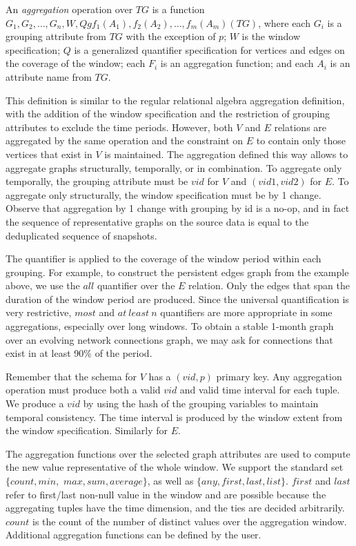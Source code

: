 \begin{definition}[\tg Aggregation]
An {\em aggregation} operation over $TG$ is a function \\ $G_1, G_2,
\ldots, G_n, W, Q g f_1(A_1), f_2(A_2), \ldots, f_m(A_m)(TG)$, where
each $G_i$ is a grouping attribute from $TG$ with the exception of
$p$; $W$ is the window specification; $Q$ is a generalized quantifier
specification for vertices and edges on the coverage of the window;
each $F_i$ is an aggregation function; and each $A_i$ is an attribute
name from $TG$.
\label{def:agg}
\end{definition}

This definition is similar to the regular relational algebra
aggregation definition, with the addition of the window specification
and the restriction of grouping attributes to exclude the time
periods.  However, both $V$ and $E$ relations are aggregated by the
same operation and the constraint on $E$ to contain only those
vertices that exist in $V$ is maintained.  The aggregation defined
this way allows to aggregate graphs structurally, temporally, or in
combination.  To aggregate only temporally, the grouping attribute
must be $vid$ for $V$ and $(vid1, vid2)$ for $E$.  To aggregate only
structurally, the window specification must be by 1 change.  Observe
that aggregation by 1 change with grouping by id is a no-op, and in
fact the sequence of representative graphs on the source data is equal
to the deduplicated sequence of snapshots.

The quantifier is applied to the coverage of the window period within
each grouping.  For example, to construct the persistent edges graph
from the example above, we use the $all$ quantifier over the $E$ relation.
Only the edges that span the duration of the window period are
produced.  Since the universal quantification is very restrictive,
$most$ and $at\ least\ n$ quantifiers are more appropriate in some
aggregations, especially over long windows.  To obtain a stable
1-month graph over an evolving network connections graph, we may ask
for connections that exist in at least 90\% of the period.

Remember that the schema for $V$ has a $(vid, p)$ primary key.  Any
aggregation operation must produce both a valid $vid$ and valid time
interval for each tuple.  We produce a $vid$ by using the hash of the
grouping variables to maintain temporal consistency.  The time
interval is produced by the window extent from the window
specification. Similarly for $E$.

The aggregation functions over the selected graph attributes are used
to compute the new value representative of the whole window.  We
support the standard set $\{count, min,$ $max, sum, average\}$, as
well as $\{any, first, last, list\}$.  $first$ and $last$ refer to
first/last non-null value in the window and are possible because the
aggregating tuples have the time dimension, and the ties are decided
arbitrarily.  $count$ is the count of the number of distinct values
over the aggregation window.  Additional aggregation functions can be
defined by the user.

